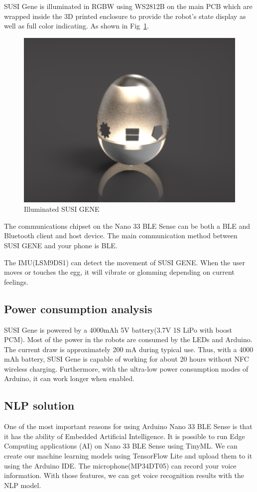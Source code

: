 \documentclass[manuscript,screen]{acmart}
\begin{document}
SUSI Gene is illuminated in RGBW using WS2812B on the main PCB which are wrapped inside the 3D printed enclosure to provide the robot’s state display as well as full color indicating. As shown in Fig~\ref{Illum}.

\begin{figure}[h]
  \centering
  \includegraphics[width=0.7\linewidth]{egg4.jpg}
  \caption{Illuminated SUSI GENE}
  \label{Illum}
\end{figure}

The communications chipset on the Nano 33 BLE Sense can be both a BLE and Bluetooth client and host device. The main communication method between SUSI GENE and your phone is BLE.

The IMU(LSM9DS1) can detect the movement of SUSI GENE. When the user moves or touches the egg, it will vibrate or glomming depending on current feelings.

\subsection{Power consumption analysis}

SUSI Gene is powered by a 4000mAh 5V battery(3.7V 1S LiPo with boost PCM). Most of the power in the robots are consumed by the LEDs and Arduino. The current draw is approximately 200 mA during typical use. Thus, with a 4000 mAh battery, SUSI Gene is capable of working for about 20 hours without NFC wireless charging. Furthermore, with the ultra-low power consumption modes of Arduino, it can work longer when enabled.

\subsection{NLP solution}

One of the most important reasons for using Arduino Nano 33 BLE Sense is that it has the ability of Embedded Artificial Intelligence. It is possible to run Edge Computing applications (AI) on Nano 33 BLE Sense using TinyML. We can create our machine learning models using TensorFlow Lite and upload them to it using the Arduino IDE. The microphone(MP34DT05) can record your voice information. With those features, we can get voice recognition results with the NLP model.
\end{document}
